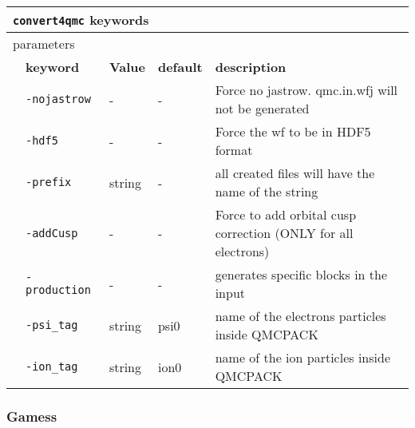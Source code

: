 \begin{table}[h]
\begin{center}
\begin{tabularx}{\textwidth}{l l l l  l }
\hline
\multicolumn{5}{l}{\texttt{convert4qmc} keywords} \\
\hline
\multicolumn{2}{l}{parameters}  & \multicolumn{3}{l}{}\\
   &   \bfseries keyword      & \bfseries Value & \bfseries default   & \bfseries description \\
   &   \texttt{-nojastrow            } &  -  & - & Force no jastrow. qmc.in.wfj will not be generated  \\
   &   \texttt{-hdf5             } &  -  & - & Force the wf to be in HDF5 format   \\
   &   \texttt{-prefix             } &  string  & - & all created files will have the name of the string   \\
   &   \texttt{-addCusp             } &  -  & - & Force to add orbital cusp correction (ONLY for all electrons)  \\
   &   \texttt{-production             } &  -  & - & generates specific blocks in the input     \\
   &   \texttt{-psi_tag             } &  string  & psi0 & name of the electrons particles inside QMCPACK   \\
   &   \texttt{-ion_tag             } & string & ion0 & name of the ion particles inside QMCPACK      \\
    \hline

    \end{tabularx}
\end{center}
\end{table}


\subsubsection{Gamess}
